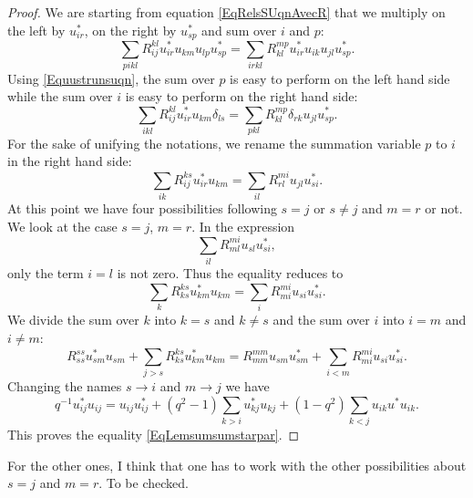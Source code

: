 \begin{proof}
	We are starting from equation \eqref{EqRelsSUqnAvecR} that we multiply on the left by \( u^*_{ir}\), on the right by \( u^*_{sp}\) and sum over \( i\) and \( p\):
	\begin{equation}
		\sum_{pikl}R^{kl}_{ij}u^*_{ir}u_{km}u_{lp}u^*_{sp}=\sum_{irkl}R^{mp}_{kl}u^*_{ir}u_{ik}u_{jl}u^*_{sp}.
	\end{equation}
	Using \eqref{Equustrunsuqn}, the sum over \( p\) is easy to perform on the left hand side while the sum over \( i\) is easy to perform on the right hand side:
	\begin{equation}
		\sum_{ikl}R^{kl}_{ij}u^*_{ir}u_{km}\delta_{ls}=\sum_{pkl}R^{mp}_{kl}\delta_{rk}u_{jl}u^*_{sp}.
	\end{equation}
	For the sake of unifying the notations, we rename the summation variable \( p\) to \( i\) in the right hand side:
	\begin{equation}
		\sum_{ik}R^{ks}_{ij}u^*_{ir}u_{km}=\sum_{il}R^{mi}_{rl}u_{jl}u^*_{si}.
	\end{equation}
	At this point we have four possibilities following \( s=j\) or \( s\neq j\) and \( m=r\) or not. We look at the case \( s=j\), \( m=r\). In the expression
	\begin{equation}
		\sum_{il}R^{mi}_{ml}u_{sl}u^*_{si},
	\end{equation}
	only the term \( i=l\) is not zero. Thus the equality reduces to
	\begin{equation}
		\sum_kR_{ks}^{ks}u^*_{km}u_{km}=\sum_iR^{mi}_{mi}u_{si}u^*_{si}.
	\end{equation}
	We divide the sum over \( k\) into \( k=s\) and \( k\neq s\) and the sum over \( i\) into \( i=m\) and \( i\neq m\):
	\begin{equation}
		R_{ss}^{ss}u^*_{sm}u_{sm}+\sum_{j>s}R^{ks}_{ks}u^*_{km}u_{km}=R_{mm}^{mm}u_{sm}u^*_{sm}+\sum_{i<m}R_{mi}^{mi}u_{si}u^*_{si}.
	\end{equation}
	Changing the names \( s\to i\) and \( m\to j\) we have
	\begin{equation}
		q^{-1}u^*_{ij}u_{ij}=u_{ij}u_{ij}^*+(q^2-1)\sum_{k>i}u^*_{kj}u_{kj}+(1-q^2)\sum_{k<j}u_{ik}u^*u_{ik}.
	\end{equation}
	This proves the equality \eqref{EqLemsumsumstarpar}.
\end{proof}

\begin{probleme}
	For the other ones, I think that one has to work with the other possibilities about \( s=j\) and \( m=r\). To be checked.
\end{probleme}


